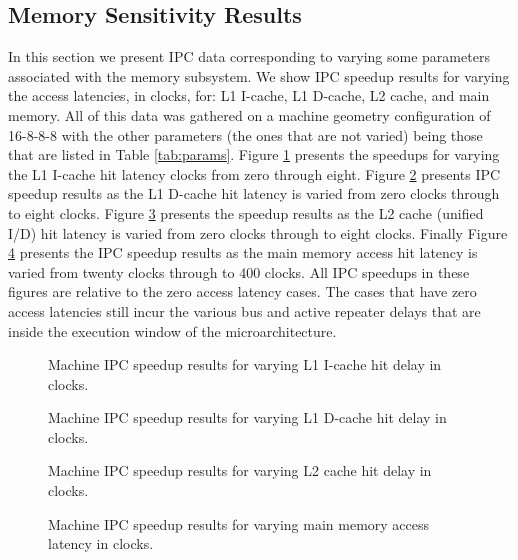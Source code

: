 \documentclass[10pt,dvips]{article}
\begin{document}
\subsection{Memory Sensitivity Results}
%
In this section we present IPC data corresponding to varying some
parameters associated with the memory subsystem.
We show IPC speedup results for varying the access latencies,
in clocks, for: L1 I-cache,
L1 D-cache,
L2 cache, and
main memory.
All of this data was gathered on a machine geometry configuration
of 16-8-8-8 with the other parameters (the ones that are
not varied) being those that are listed in Table \ref{tab:params}.
Figure \ref{fig:mem1} presents the speedups for varying
the L1 I-cache hit latency clocks from zero through eight.
Figure \ref{fig:mem2} presents IPC speedup results
as the L1 D-cache hit latency is varied from zero clocks through to
eight clocks.
Figure \ref{fig:mem3} presents the speedup results
as the L2 cache (unified I/D) hit latency is varied from 
zero clocks through to eight clocks.
Finally Figure \ref{fig:mem4} presents the IPC speedup results
as the main memory access hit latency is varied from twenty clocks 
through to 400 clocks.
All IPC speedups in these figures are relative to the zero
access latency cases.  The cases that have zero access latencies
still incur the various bus and active repeater delays that
are inside the execution window of the microarchitecture.
%
\begin{figure}
\centering
{}
\caption{Machine IPC speedup results for varying 
L1 I-cache hit delay in clocks.}
\label{fig:mem1}
\end{figure}
%
\begin{figure}
\centering
{}
\caption{Machine IPC speedup results for varying 
L1 D-cache hit delay in clocks.}
\label{fig:mem2}
\end{figure}
%
\begin{figure}
\centering
{}
\caption{Machine IPC speedup results for varying 
L2 cache hit delay in clocks.}
\label{fig:mem3}
\end{figure}
%
\begin{figure}
\centering
{}
\caption{Machine IPC speedup results for varying 
main memory access latency in clocks.}
\label{fig:mem4}
\end{figure}
\end{document}
